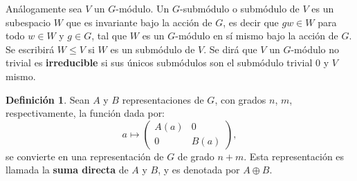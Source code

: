 \documentclass[12pt]{book}
\theoremstyle{definition}
\newtheorem{definition}[theorem]{Definición}
\newcounter{in}
\newcounter{ini}
\begin{document}
\begin{mdframed}
  Análogamente sea $V$ un $G$-módulo. Un $G$-submódulo o
submódulo de $V$ es un subespacio $W$ que es invariante bajo la acción de
$G$, es decir que $gw \in W$ para todo $w \in W$ y $g \in G$, tal que
$W$ es un $G$-módulo en sí mismo bajo la acción de $G$. Se escribirá
$W \leq V$ si $W$ es un submódulo de $V$. Se dirá que $V$ un
$G$-módulo no trivial es \textbf{irreducible} si sus únicos submódulos
son el submódulo trivial $0$ y $V$ mismo.
\end{mdframed}
\begin{definition}
Sean $A$ y $B$ representaciones de $G$, con grados $n$, $m$,
respectivamente, la función dada por:
\begin{equation*}
  a\mapsto
  \begin{pmatrix}
    A\left(a\right) & 0 \\ 
    0 & B\left(a\right)
  \end{pmatrix}, 
\end{equation*}
se convierte en una representación de $G$ de grado $n+m$. Esta
representación es llamada la \textbf{suma directa} de $A$ y
$B$, y es denotada por $A \oplus B$.
\end{definition}
\end{document}
